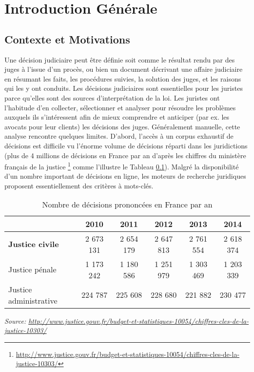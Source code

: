 %
\chapter*{Introduction Générale}
\label{chap:intro}

\section{Contexte et Motivations}
\label{sec:intro:contexte}
Une décision judiciaire peut être définie soit comme  le résultat rendu par des juges à l'issue d'un procès, ou bien un document décrivant une affaire judiciaire en résumant les faits, les procédures suivies, la solution des juges, et les raisons qui les y ont conduits. %
Les décisions judiciaires sont essentielles pour les juristes parce qu'elles sont des sources d'interprétation de la loi. Les juristes ont l'habitude d'en collecter, sélectionner et analyser pour résoudre les problèmes auxquels ils s'intéressent afin de mieux comprendre \citep{ancel2003expulsion} et anticiper (par ex. les avocats pour leur clients) les décisions des juges. Généralement manuelle, cette analyse rencontre quelques limites. D'abord, l'accès à un corpus exhaustif de décisions est difficile vu l'énorme volume de décisions réparti dans les juridictions (plus de 4 millions de décisions en France par an d'après les chiffres du ministère français de la justice \footnote{\url{http://www.justice.gouv.fr/budget-et-statistiques-10054/chiffres-cles-de-la-justice-10303/}} comme l'illustre le Tableau \ref{tab:intro:nbdecisionstats}). Malgré la disponibilité d'un nombre important de décisions en ligne, les moteurs de recherche juridiques proposent essentiellement des critères à mots-clés. 
\begin{table}[!h]
{
\scriptsize
\begin{center}
\begin{tabular}{|p{2cm}|c|c|c|c|c|}
\hline
 & \textbf{2010} & \textbf{2011} & \textbf{2012} & \textbf{2013} & \textbf{2014} \\
 \hline
 \textbf{Justice civile} & 2 673 131  & 2 654 179 & 2 647 813 & 2 761 554  & 2 618 374 \\
 \hline
Justice pénale & 1 173 242 & 1 180 586 & 1 251 979 & 1 303 469 & 1 203 339 \\
 \hline
 Justice administrative & 224 787 & 225 608 & 228 680 & 221 882 & 230 477 \\
 \hline
\end{tabular}

\textit{\scriptsize{Source: \url{http://www.justice.gouv.fr/budget-et-statistiques-10054/chiffres-cles-de-la-justice-10303/}}}  
\end{center}
}
\caption{Nombre de décisions prononcées en France par an}\label{tab:intro:nbdecisionstats}
\end{table}


